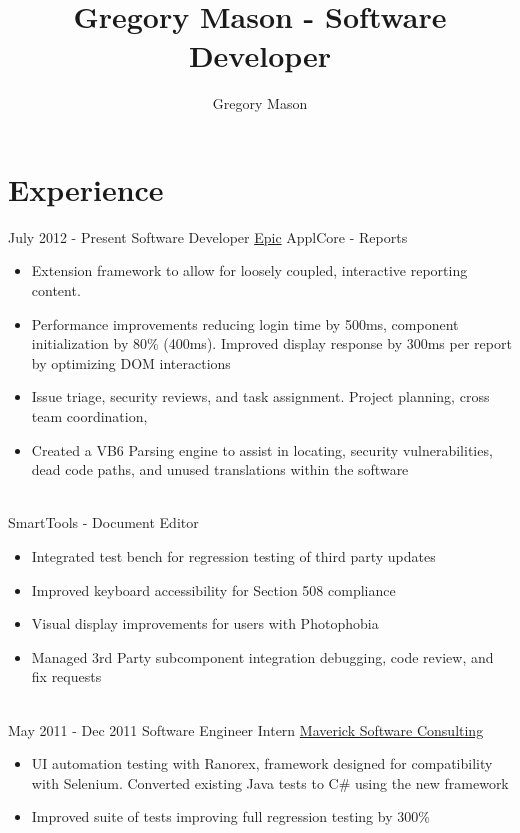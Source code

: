 \documentclass[letterpaper]{twentysecondcv} %
\author{Gregory Mason}
\title{Gregory Mason - Software Developer}
\begin{document}
\makeprofile %


\section{Experience}

\begin{twenty} %
\twentyitem
    	{July 2012 -}
		{Present}
        {Software Developer}
        {\href{https://www.epic.com/}{Epic}}
        {ApplCore - Reports}
        {\begin{itemize}
   		\item Extension framework to allow for loosely coupled, interactive reporting content.
   		
   		\item Performance improvements reducing login time by 500ms, component initialization by 80\% (400ms). Improved display response by 300ms per report by optimizing DOM interactions
   		
   		\item Issue triage, security reviews, and task assignment. Project planning, cross team coordination,
   		
   		\item Created a VB6 Parsing engine to assist in locating, security vulnerabilities, dead code paths, and unused translations within the software
        \end{itemize}}
\twentyitem
{}
{}
{ \\ \textnormal{SmartTools - Document Editor}}
{}
{}
{\begin{itemize}
\item Integrated test bench for regression testing of third party updates
\item Improved keyboard accessibility for Section 508 compliance
\item Visual display improvements for users with Photophobia
\item Managed 3rd Party subcomponent integration debugging, code review, and fix requests

\end{itemize}}
        \\
	\twentyitem
		{May 2011 -}
		{Dec 2011}
        {Software Engineer Intern}
        {\href{http://www.mavericksoftware.com/}{Maverick Software Consulting}}
        {}
        {
        {\begin{itemize}
        \item UI automation testing with Ranorex, framework designed for compatibility with Selenium. Converted existing Java tests to C\# using the new framework
        \item Improved suite of tests improving full regression testing by 300\%
        

\end{itemize}}}
\end{twenty}
\end{document}
